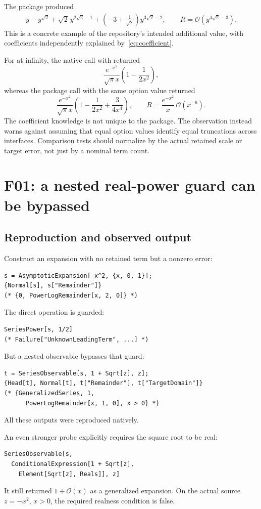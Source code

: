 \documentclass[11pt,a4paper]{article}
\newcommand{\code}[1]{\texttt{\detokenize{#1}}}
\newcommand{\OO}{\mathcal O}
\begin{document}
The package produced
\begin{align*}
 y-y^{\sqrt2}+\sqrt2\,y^{2\sqrt2-1}
 +\left(-3+\frac1{\sqrt2}\right)y^{3\sqrt2-2},
 \qquad R=\OO(y^{4\sqrt2-3}).
\end{align*}
This is a concrete example of the repository's intended additional value, with coefficients independently explained by~\eqref{eq:coefficient}.

For \code{Erfc[x]} at infinity, the native \code{Asymptotic} call with \code{SeriesTermGoal -> 3} returned
\[
 \frac{e^{-x^2}}{\sqrt\pi x}\left(1-\frac1{2x^2}\right),
\]
whereas the package call with the same option value returned
\[
 \frac{e^{-x^2}}{\sqrt\pi x}
 \left(1-\frac1{2x^2}+\frac3{4x^4}\right),
 \qquad
 R=\frac{e^{-x^2}}x\,\OO(x^{-6}).
\]
The coefficient knowledge is not unique to the package. The observation instead warns against assuming that equal option values identify equal truncations across interfaces. Comparison tests should normalize by the actual retained scale or target error, not just by a nominal term count.

\section{F01: a nested real-power guard can be bypassed}

\subsection{Reproduction and observed output}
Construct an expansion with no retained term but a nonzero error:
\begin{lstlisting}
s = AsymptoticExpansion[-x^2, {x, 0, 1}];
{Normal[s], s["Remainder"]}
(* {0, PowerLogRemainder[x, 2, 0]} *)
\end{lstlisting}
The direct operation is guarded:
\begin{lstlisting}
SeriesPower[s, 1/2]
(* Failure["UnknownLeadingTerm", ...] *)
\end{lstlisting}
But a nested observable bypasses that guard:
\begin{lstlisting}
t = SeriesObservable[s, 1 + Sqrt[z], z];
{Head[t], Normal[t], t["Remainder"], t["TargetDomain"]}
(* {GeneralizedSeries, 1,
      PowerLogRemainder[x, 1, 0], x > 0} *)
\end{lstlisting}
All these outputs were reproduced natively.

An even stronger probe explicitly requires the square root to be real:
\begin{lstlisting}
SeriesObservable[s,
  ConditionalExpression[1 + Sqrt[z],
    Element[Sqrt[z], Reals]], z]
\end{lstlisting}
It still returned $1+\OO(x)$ as a generalized expansion. On the actual source $z=-x^2$, $x>0$, the required realness condition is false.
\end{document}
